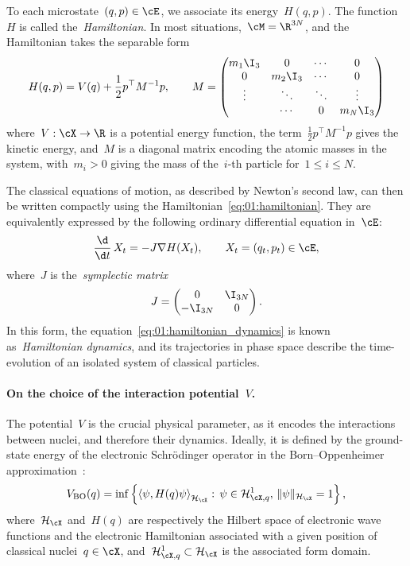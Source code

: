 To each microstate~$(q,p)\in\cE$, we associate its energy~$H(q,p)$. The function~$H$ is called the~\textit{Hamiltonian}. In most situations,~$\cM=\R^{3N}$, and the Hamiltonian takes the separable form
\begin{equation}
    \label{eq:01:hamiltonian}
    H(q,p) = V(q) + \frac12p^\top M^{-1}p,\qquad M = \begin{pmatrix}
    m_1 \I_3 & 0 & \dotsm & 0 \\
    0 & m_2 \I_3 & \dotsm & 0 \\
    \vdots & \ddots & \ddots & \vdots\\
    & \dotsm & 0 & m_N \I_3 
\end{pmatrix}
\end{equation}
where~$V:\cX\to\R$ is a potential energy function, the term~$\frac12p^\top M^{-1}p$ gives the kinetic energy, and~$M$ is a diagonal matrix encoding the atomic masses in the system, with~$m_i>0$ giving the mass of the~$i$-th particle for~$1\leq i\leq N$.

The classical equations of motion, as described by Newton's second law, can then be written compactly using the Hamiltonian~\eqref{eq:01:hamiltonian}. They are equivalently expressed by the following ordinary differential equation in~$\cE$:
\begin{equation}
    \label{eq:01:hamiltonian_dynamics}
    \frac{\d}{\d t}\,X_t = -J\nabla H(X_t),\qquad X_t = (q_t,p_t)\in \cE,
\end{equation}
where~$J$ is the~\textit{symplectic matrix}
\begin{equation}
    \label{eq:01:J}
    J=\begin{pmatrix}
        0&\I_{3N}\\-\I_{3N}&0
    \end{pmatrix}.
\end{equation}
In this form, the equation~\eqref{eq:01:hamiltonian_dynamics} is known as~\textit{Hamiltonian dynamics}, and its trajectories in phase space describe the time-evolution of an isolated system of classical particles.

\paragraph{On the choice of the interaction potential~$V$.}
The potential~$V$ is the crucial physical parameter, as it encodes the interactions between nuclei, and therefore their dynamics. Ideally, it is defined by the ground-state energy of the electronic Schr\"odinger operator in the Born--Oppenheimer approximation~\cite{BO27}:
\begin{equation}
    \label{eq:01:schrodinger}
    V_{\mathrm{BO}}(q) = \inf\left\{\left\langle\psi, H(q) \psi\right\rangle_{\mathcal H_\cX}:\,\psi \in \mathcal H^1_{\cX,q},\,\|\psi\|_{\mathcal H_\cX}=1\right\},
\end{equation}
where~$\mathcal H_{\cX}$ and~$H(q)$ are respectively the Hilbert space of electronic wave functions and the electronic Hamiltonian associated with a given position of classical nuclei~$q\in\cX$, and~$\mathcal H^1_{\cX,q}\subset \mathcal H_{\cX}$ is the associated form domain.

